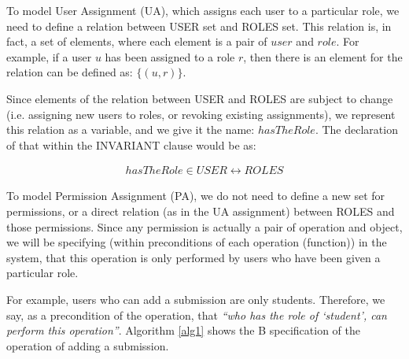 To model User Assignment (UA), which assigns each user to a particular role, we need to define a relation between USER set and ROLES set.  This relation is, in fact, a set of elements, where each element is a pair of $user$ and $role$.  For example, if a user $u$ has been assigned to a role $r$, then there is an element for the relation can be defined as: $\{(u, r)\}$.

Since elements of the relation between USER and ROLES are subject to change (i.e. assigning new users to roles, or revoking existing assignments), we represent this relation as a variable, and we give it the name: $hasTheRole$.  The declaration of that within the INVARIANT clause would be as: 

\begin{align*}
hasTheRole \in USER \leftrightarrow ROLES
\end{align*}


To model Permission Assignment (PA), we do not need to define a new set for permissions, or a direct relation (as in the UA assignment) between ROLES and those permissions.  Since any permission is actually a pair of operation and object, we will be specifying (within preconditions of each operation (function)) in the system, that this operation is only performed by users who have been given a particular role.

For example, users who can add a submission are only students.  Therefore, we say, as a precondition of the operation, that \textit{“who has the role of ‘student’, can perform this operation”}.  Algorithm \ref{alg1} shows the B specification of the operation of adding a submission.

